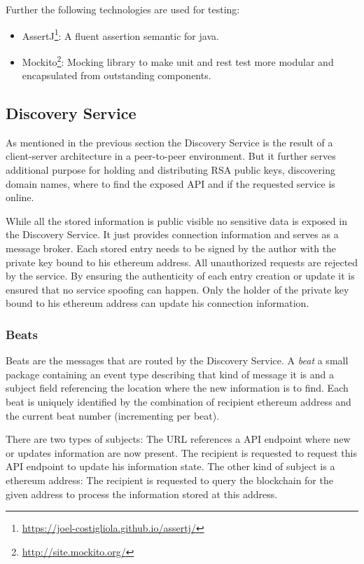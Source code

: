 Further the following technologies are used for testing:

\begin{itemize}
\item AssertJ\footnote{\url{https://joel-costigliola.github.io/assertj/}}: A fluent assertion semantic for java. 
\item Mockito\footnote{\url{http://site.mockito.org/}}: Mocking library to make unit and rest test more modular and encapsulated from outstanding components. 
\end{itemize}

\subsection{Discovery Service}
\label{sec:discoveryService}
As mentioned in the previous section the Discovery Service is the result of a client-server architecture in a peer-to-peer environment. But it further serves additional purpose for holding and distributing RSA public keys, discovering domain names, where to find the exposed API and if the requested service is online. 

While all the stored information is public visible no sensitive data is exposed in the Discovery Service. It just provides connection information and serves as a message broker. Each stored entry needs to be signed by the author with the private key bound to his ethereum address. All unauthorized requests are rejected by the service. By ensuring the authenticity of each entry creation or update it is ensured that no service spoofing can happen. Only the holder of the private key bound to his ethereum address can update his connection information.

\subsubsection{Beats}
Beats are the messages that are routed by the Discovery Service. A \textit{beat} a small package containing an event type describing that kind of message it is and a subject field referencing the location where the new information is to find. Each beat is uniquely identified by the combination of recipient ethereum address and the current beat number (incrementing per beat). 

There are two types of subjects: The URL references a API endpoint where new or updates information are now present. The recipient is requested to request this API endpoint to update his information state. The other kind of subject is a ethereum address: The recipient is requested to query the blockchain for the given address to process the information stored at this address. 

